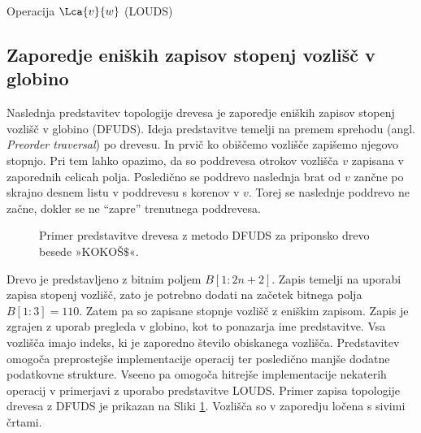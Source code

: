 \begin{algorithm}[hbt]

\caption{Operacija $\Lca{v}{w}$ (LOUDS)}\label{alg:LOUDSlca}
{
    
}
\end{algorithm}


\subsection{Zaporedje eniških zapisov stopenj vozlišč v globino}\label{sec:DFUDS}

Naslednja predstavitev topologije drevesa je zaporedje eniških zapisov stopenj vozlišč v globino (DFUDS). Ideja predstavitve temelji na premem sprehodu (angl. \textit{Preorder traversal}) po drevesu. In prvič ko obiščemo vozlišče zapišemo njegovo stopnjo. Pri tem lahko opazimo, da so poddrevesa otrokov vozlišča $v$ zapisana v zaporednih celicah polja. Posledično se poddrevo naslednja brat od $v$ zančne po skrajno desnem listu v poddrevesu s korenov v $v$. Torej se naslednje poddrevo ne začne, dokler se ne \enquote{zapre} trenutnega poddrevesa. 
\begin{figure}[htb]
    \begin{center}
        
        \caption{Primer predstavitve drevesa z metodo DFUDS za priponsko drevo besede »KOKOŠ$\$$«.} 
        \label{fig:DFUDS}
    \end{center}
\end{figure}

Drevo je predstavljeno z bitnim poljem $B[1:2n+2]$. Zapis temelji na uporabi zapisa stopenj vozlišč, zato je potrebno dodati na začetek bitnega polja $B[1:3]=110$. Zatem pa so zapisane stopnje vozlišč z eniškim zapisom. Zapis je zgrajen z uporab pregleda v globino, kot to ponazarja ime predstavitve. Vsa vozlišča imajo indeks, ki je zaporedno število obiskanega vozlišča. Predstavitev omogoča preprostejše implementacije operacij ter posledično manjše dodatne podatkovne strukture. Vseeno pa omogoča hitrejše implementacije nekaterih operacij v primerjavi z uporabo predstavitve LOUDS. Primer zapisa topologije drevesa z DFUDS je prikazan na Sliki \ref{fig:DFUDS}. Vozlišča so v zaporedju ločena s sivimi črtami.

